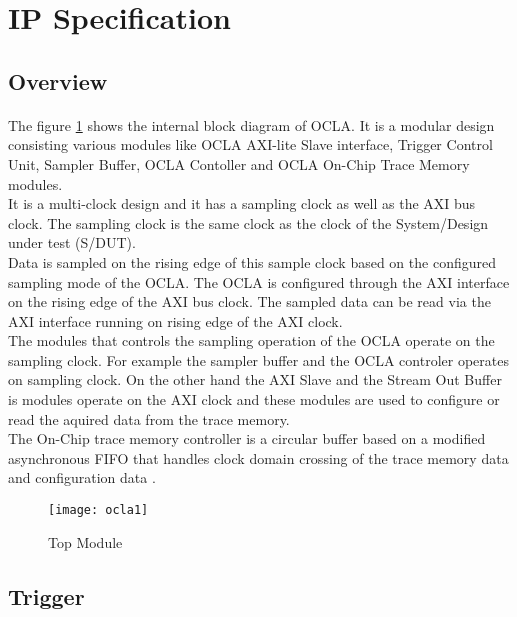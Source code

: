 \newpage
\section*{\hfill IP Specification}

\subsection*{\fontsize{14}{16}\selectfont Overview}

\paragraph{} The figure \ref{fig:ocla1} shows the internal block diagram of OCLA. It is a modular design consisting various modules like OCLA AXI-lite Slave interface, Trigger Control Unit, Sampler Buffer, OCLA Contoller and OCLA On-Chip Trace Memory modules.
\\ It is a multi-clock design and it has a sampling clock as well as the AXI bus clock. The sampling clock is the same clock as the clock of the System/Design under test (S/DUT).\\ Data is sampled on the rising edge of this sample clock based on the configured sampling mode of the OCLA. The OCLA is configured through the AXI interface on the rising edge of the AXI bus clock. The sampled data can be read via the AXI interface running on rising edge of the AXI clock. 
\\The modules that controls the sampling operation of the OCLA operate on the sampling clock. For example the sampler buffer and the OCLA controler operates on sampling clock.
On the other hand the AXI Slave and the Stream Out Buffer is modules operate on the AXI clock and these modules are used to configure or read the aquired data from the trace memory.\\
The On-Chip trace memory controller is a circular buffer based on a modified asynchronous FIFO that handles clock domain crossing of the trace memory data and configuration data .    

\begin{figure}[h]\centering %
	\texttt{[image: ocla1]}
	\caption{Top Module}
	\label{fig:ocla1}
\end{figure}


\subsection*{\fontsize{14}{16}\selectfont Trigger}
